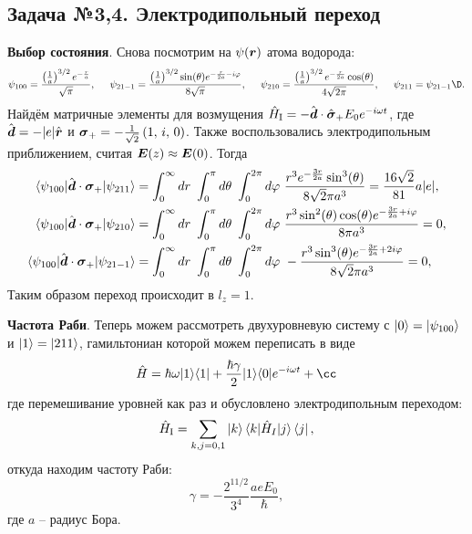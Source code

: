 \subsection*{Задача №3,4. Электродипольный переход}

\textbf{Выбор состояния}.
Снова посмотрим на $\psi(\mbox{\boldmath $r$})$ атома водорода:
\begin{equation*}
	\psi_{100} = \frac{\left(\frac{1}{a}\right)^{3/2} e^{-\frac{r}{a}}}{\sqrt{\pi }},
	\hspace{5mm}
	\psi_{21-1} = \frac{\left(\frac{1}{a}\right)^{3/2} \sin (\theta ) e^{-\frac{r}{2 a}-i \varphi }}{8 \sqrt{\pi }},
	\hspace{5 mm} 
	\psi_{210} = \frac{\left(\frac{1}{a}\right)^{3/2} e^{-\frac{r}{2 a}} \cos (\theta )}{4 \sqrt{2 \pi }},
	\hspace{5 mm} 
	\psi_{211} = \psi_{21-1}\D.
\end{equation*}
Найдём матричные элементы для возмущения
$\hat{H}_{\textnormal{I}} = - \hat{\mbox{\boldmath $d$}} \cdot \hat{\mbox{\boldmath $\sigma$}}_+ E_0 e^{-i \omega t}$, где
$\hat{\mbox{\boldmath $d$}} = - |e| \hat{\mbox{\boldmath $r$}}$ и $\mbox{\boldmath $\sigma$}_+ = -\frac{1}{\sqrt{2}}\left(1,\, i,\, 0\right)$. Также воспользовались электродипольным приближением, считая $\mbox{\boldmath $E$}(z) \approx	\mbox{\boldmath $E$}(0)$. Тогда
\begin{align*}
	\bk{\psi_{100}}[\hat{\vc{d}} \cdot \vc{\sigma}_+]{\psi_{211}} &= \int_{0}^{\infty} dr\ \int_{0}^{\pi} d \theta\ \int_{0}^{2\pi} d \varphi \ 
		\frac{r^3 e^{-\frac{3 r}{2 a}} \sin ^3(\theta )}{8 \sqrt{2} \pi  a^3} 
		= \frac{16 \sqrt{2}}{81} a |e|, \\
	\bk{\psi_{100}}[\hat{\vc{d}} \cdot \vc{\sigma}_+]{\psi_{210}} &= \int_{0}^{\infty} dr\ \int_{0}^{\pi} d \theta\ \int_{0}^{2\pi} d \varphi \ 
		\frac{r^3 \sin ^2(\theta ) \cos (\theta ) e^{-\frac{3 r}{2 a}+i \varphi }}{8 \pi  a^3} 
		= 0, \\
	\bk{\psi_{100}}[\hat{\vc{d}} \cdot \vc{\sigma}_+]{\psi_{21-1}} &= \int_{0}^{\infty} dr\ \int_{0}^{\pi} d \theta\ \int_{0}^{2\pi} d \varphi \ 
		-\frac{r^3 \sin ^3(\theta ) e^{-\frac{3 r}{2 a}+2 i \varphi }}{8 \sqrt{2} \pi  a^3} 
		= 0,
\end{align*}
Таким образом переход происходит в $l_z = 1$. 

\textbf{Частота Раби}. Теперь можем рассмотреть двухуровневую систему с $\left| 0 \right\rangle = \left| \psi_{100} \right\rangle$ и $\left| 1 \right\rangle = \left| 211 \right\rangle$, гамильтониан которой можем переписать в виде
\begin{equation*}
	\hat{H} = \hbar \omega \kb{1}{1} + \frac{\hbar \gamma}{2} \kb{1}{0} e^{-i \omega t} + \cc
\end{equation*}
где перемешивание уровней как раз и обусловлено электродипольным переходом:
\begin{equation*}
	\sub{\hat{H}}{I} = \sum_{k, j = 0, 1} \ket{k} \bk{k}[\hat{H}_I]{j} \bra{j},
\end{equation*}
откуда находим частоту Раби:
\begin{equation*}
	\gamma = -\frac{2^{11/2}}{3^{4}} \frac{a e E_0}{\hbar},
\end{equation*}
где $a$ -- радиус Бора.
